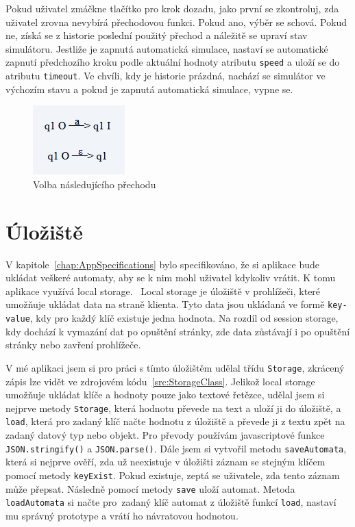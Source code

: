 Pokud uživatel zmáčkne tlačítko pro krok dozadu, jako první se zkontroluj, zda uživatel zrovna nevybírá přechodovou funkci. Pokud ano, výběr se schová. Pokud ne, získá se z historie poslední použitý přechod a náležitě se upraví stav simulátoru. Jestliže je zapnutá automatická simulace, nastaví se automatické zapnutí předchozího kroku podle aktuální hodnoty atributu \texttt{speed} a uloží se do atributu \texttt{timeout}. Ve chvíli, kdy je historie prázdná, nachází se simulátor ve výchozím stavu a pokud je zapnutá automatická simulace, vypne se.

\begin{figure}[h]
    \centering
    \includegraphics{Figures/PrntScrn_TransitionFunctionChoosing.png}
    \caption{Volba následujícího přechodu}\label{fig:TransitionFunctionChoosing}
\end{figure}

\section{Úložiště}

V kapitole~\ref{chap:AppSpecifications} bylo specifikováno, že si aplikace bude ukládat veškeré automaty, aby se k nim mohl uživatel kdykoliv vrátit. K tomu aplikace využívá local storage.~\cite{LocalStorage} Local storage je úložiště v prohlížeči, které umožňuje ukládat data na straně klienta. Tyto data jsou ukládaná ve formě \texttt{key-value}, kdy pro každý klíč existuje jedna hodnota. Na rozdíl od session storage, kdy dochází k vymazání dat po opuštění stránky, zde data zůstávají i po opuštění stránky nebo zavření prohlížeče.~\cite{Obaseki2020}

V mé aplikaci jsem si pro práci s tímto úložištěm udělal třídu \texttt{Storage}, zkrácený zápis lze vidět ve zdrojovém kódu~\ref{src:StorageClass}. Jelikož local storage umožňuje ukládat klíče a hodnoty pouze jako textové řetězce, udělal jsem si nejprve metody \texttt{Storage}, která hodnotu převede na text a uloží ji do úložiště, a \texttt{load}, která pro zadaný klíč načte hodnotu z úložiště a převede ji z textu zpět na zadaný datový typ nebo objekt. Pro převody používám javascriptové funkce \texttt{JSON.stringify()} a \texttt{JSON.parse()}. Dále jsem si vytvořil metodu \texttt{saveAutomata}, která si nejprve ověří, zda už neexistuje v úložišti záznam se stejným klíčem pomocí metody \texttt{keyExist}. Pokud existuje, zeptá se uživatele, zda tento záznam může přepsat. Následně pomocí metody \texttt{save} uloží automat. Metoda \texttt{loadAutomata} si načte pro~zadaný klíč automat z úložiště funkcí \texttt{load}, nastaví mu správný prototype a vrátí ho návratovou hodnotou. 


